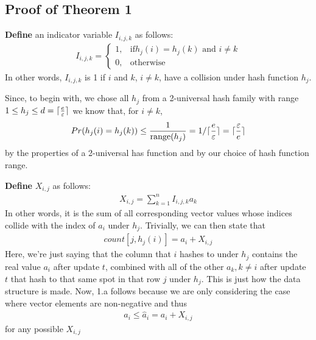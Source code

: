 \documentclass[11pt]{article}
\DeclarePairedDelimiter\ceil{\lceil}{\rceil}
\begin{document}
\subsection{Proof of Theorem 1}
\textbf{Define} an indicator variable $I_{i, j, k}$ as follows:
\begin{align}
    I_{i, j, k} = 
    \begin{cases}
        1, & \text{if} h_j(i) = h_j(k) \text{ and } i \neq k \\
        0, & \text{otherwise}
    \end{cases}
\end{align}
In other words, $I_{i, j, k}$ is 1 if $i$ and $k$, $i \neq k$, have
a collision under hash function $h_j$.

Since, to begin with, we chose all $h_j$ from a 2-universal hash family
with range $1 \leq h_j \leq d = \ceil{\frac{e}{\varepsilon}}$ 
we know that, for $i \neq k$,
\begin{align}\label{eq:collision-prob}
    Pr(h_j(i) = h_j(k)) \leq \frac{1}{\text{range}(h_j)} = 1/\ceil{\frac{e}{\varepsilon}} = \ceil{\frac{\varepsilon}{e}}
\end{align}
by the properties of a 2-universal has function and by our choice of hash function
range.

\textbf{Define} $X_{i, j}$ as follows:
\begin{align}
    X_{i, j} = \sum_{k = 1}^{n}I_{i, j, k} a_k
\end{align}
In other words, it is the sum of all corresponding vector values whose indices
collide with the index of $a_i$ under $h_j$. Trivially, we can then state that
\begin{align}\label{eq:count-def}
    count[j, h_j(i)] = a_i + X_{i, j} 
\end{align}
Here, we're just saying that the column that $i$ hashes to under $h_j$
contains the real value $a_i$ after update $t$, combined with all of the other
$a_k, k \neq i$ after update $t$ that hash to that same spot in that row $j$ under
$h_j$. This is just how the data structure is made.  Now, 1.a follows because
we are only considering the case where vector elements are non-negative and thus
\begin{align}
    a_i \leq \hat a_i = a_i + X_{i, j}
\end{align}
for any possible $X_{i, j}$
\end{document}
